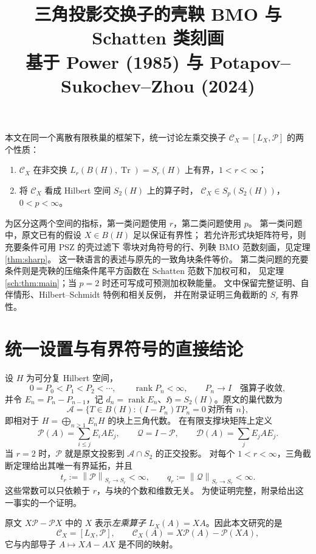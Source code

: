 \documentclass[UTF8,11pt,a4paper,fontset=fandol]{ctexart}
\title{三角投影交换子的壳鞅 BMO 与 Schatten 类刻画\\
\large 基于 Power (1985) 与 Potapov--Sukochev--Zhou (2024)}
\author{}
\date{}
\theoremstyle{remark}
\newcommand{\BH}{B(H)}
\newcommand{\Tr}{\operatorname{Tr}}
\newcommand{\PP}{\mathcal P}
\newcommand{\QQ}{\mathcal Q}
\newcommand{\DD}{\mathcal D}
\newcommand{\Alg}{\mathcal A}
\newcommand{\CC}{\mathcal C}
\newcommand{\norm}[1]{\left\lVert #1\right\rVert}
\DeclareMathOperator{\rank}{rank}
\newcommand{\HS}{\mathfrak H}
\numberwithin{equation}{section}
\begin{document}
\maketitle
\vspace{-2em}

本文在同一个离散有限秩巢的框架下，统一讨论左乘交换子
$\CC_X=[L_X,\PP]$ 的两个性质：
\begin{enumerate}[label=\textup{(\arabic*)}]
 \item $\CC_X$ 在非交换 $L_r(B(H),\Tr)=S_r(H)$ 上有界，$1<r<\infty$；
 \item 将 $\CC_X$ 看成 Hilbert 空间 $S_2(H)$ 上的算子时，
       $\CC_X\in S_p(S_2(H))$，$0<p<\infty$。
\end{enumerate}
为区分这两个空间的指标，第一类问题使用 $r$，第二类问题使用 $p$。
第一类问题中，原文已有的假设 $X\in B(H)$ 足以保证有界性；
若允许形式块矩阵符号，则充要条件可用 PSZ \cite{PSZ} 的壳过滤下
零块对角符号的行、列鞅 BMO 范数刻画，见定理 \ref{thm:sharp}。
这一鞅语言的表述与原先的一致角块条件等价。
第二类问题的充要条件则是壳鞅的压缩条件尾平方函数在 Schatten 范数下加权可和，
见定理 \ref{sch:thm:main}；当 $p=2$ 时还可写成可预测加权鞅能量。
文中保留完整证明、自伴情形、Hilbert--Schmidt 特例和相关反例，
并在附录证明三角截断的 $S_r$ 有界性。

\section{统一设置与有界符号的直接结论}

设 $H$ 为可分复 Hilbert 空间，
\[
 0=P_0<P_1<P_2<\cdots,\qquad \rank P_n<\infty,
 \qquad P_n\longrightarrow I\quad\text{强算子收敛},
\]
并令 $E_n=P_n-P_{n-1}$，记 $d_n=\rank E_n$、$\HS=S_2(H)$。原文的巢代数为
\[
 \Alg=\{T\in\BH:(I-P_n)TP_n=0\ \text{对所有 }n\},
\]
即相对于 $H=\bigoplus_{n\geq1}E_nH$ 的块上三角代数。
在有限支撑块矩阵上定义
\[
 \PP(A)=\sum_{i\leq j}E_iAE_j,\qquad
 \QQ=I-\PP,\qquad
 \DD(A)=\sum_jE_jAE_j.
\]
当 $r=2$ 时，$\PP$ 就是原文投影到 $\Alg\cap S_2$ 的正交投影。
对每个 $1<r<\infty$，三角截断定理给出其唯一有界延拓，并且
\begin{equation}\label{eq:tp}
 t_r:=\norm{\PP}_{S_r\to S_r}<\infty,\qquad
 q_r:=\norm{\QQ}_{S_r\to S_r}<\infty.
\end{equation}
这些常数可以只依赖于 $r$，与块的个数和维数无关。
为使证明完整，附录给出这一事实的一个证明。

\medskip
原文 $X\PP-\PP X$ 中的 $X$ 表示\emph{左乘算子}
$L_X(A)=XA$。因此本文研究的是
\begin{equation}\label{eq:defC}
 \CC_X=[L_X,\PP],\qquad
 \CC_X(A)=X\PP(A)-\PP(XA),
\end{equation}
它与内部导子 $A\mapsto XA-AX$ 是不同的映射。
\end{document}
